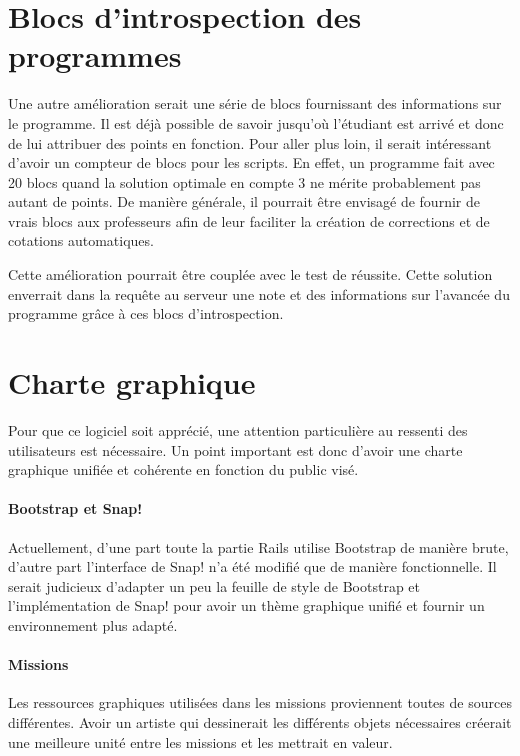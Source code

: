 \section{Blocs d'introspection des programmes}
Une autre amélioration serait une série de blocs fournissant des informations sur le programme. Il est déjà possible de savoir jusqu'où l'étudiant est arrivé et donc de lui attribuer des points en fonction. 
Pour aller plus loin, il serait intéressant d'avoir un compteur de blocs pour les scripts. En effet, un programme fait avec 20 blocs quand la solution optimale en compte 3 ne mérite probablement pas autant de points.
De manière générale, il pourrait être envisagé de fournir de vrais blocs aux professeurs afin de leur faciliter la création de corrections et de cotations automatiques.

Cette amélioration pourrait être couplée avec le test de réussite. Cette solution enverrait dans la requête au serveur une note et des informations sur l'avancée du programme grâce à ces blocs d'introspection.

\section{Charte graphique}
Pour que ce logiciel soit apprécié, une attention particulière au ressenti des utilisateurs est nécessaire. Un point important est donc d'avoir une charte graphique unifiée et cohérente en fonction du public visé.

\paragraph{Bootstrap et Snap!}
Actuellement, d'une part toute la partie Rails utilise Bootstrap de manière brute, d'autre part l'interface de Snap! n'a été modifié que de manière fonctionnelle. Il serait judicieux d'adapter un peu la feuille de style de Bootstrap et l'implémentation de Snap! pour avoir un thème graphique unifié et fournir un environnement plus adapté.

\paragraph{Missions}
Les ressources graphiques utilisées dans les missions proviennent toutes de sources différentes. Avoir un artiste qui dessinerait les différents objets nécessaires créerait une meilleure unité entre les missions et les mettrait en valeur.


% 
% 
% 
% 
% 
% 
